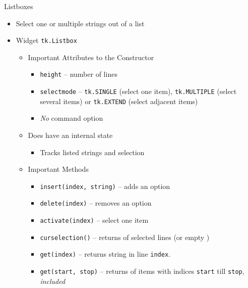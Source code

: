 \begin{frame}[fragile]{Listboxes}
%
\begin{itemize}
\item Select one or multiple strings out of a list
\item Widget \texttt{tk.Listbox}
	\begin{itemize}
	\item Important Attributes to the Constructor
		\begin{itemize}
		\item \texttt{height} -- number of lines
		\item \texttt{selectmode} -- \texttt{tk.SINGLE} (select one item), \texttt{tk.MULTIPLE} (select several items) or \texttt{tk.EXTEND} (select adjacent items)
		\item \emph{No} command option
		\end{itemize}
	\item Does have an internal state
		\begin{itemize}
		\item Tracks listed strings and selection
		\end{itemize}
	\item Important Methods 
		\begin{itemize}
		\item \texttt{insert(index, string)} -- adds an option
		\item \texttt{delete(index)} -- removes an option
		\item \texttt{activate(index)} -- select one item
		\item \texttt{curselection()} -- returns  of selected lines (or empty )
		\item \texttt{get(index)} -- returns string in line \texttt{index}.
		\item \texttt{get(start, stop)} -- returns  of items with indices \texttt{start} till \texttt{stop}, \emph{included}
		\end{itemize}
	\end{itemize}
\end{itemize}
%
\end{frame}


